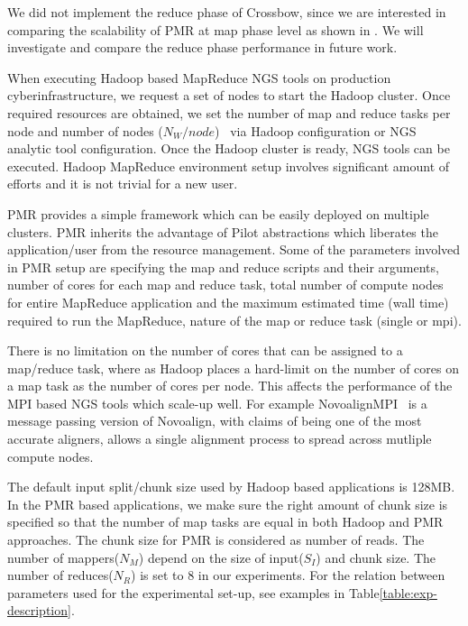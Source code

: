 \documentclass{acm_proc_article-sp}
\begin{document}
We did not implement the reduce phase of Crossbow, since we are
interested in comparing the scalability of PMR at map phase level as
shown in . We will investigate and compare the
reduce phase performance in future work.

When executing Hadoop based MapReduce NGS tools on production
cyberinfrastructure, we request a set of nodes to start the Hadoop
cluster. Once required resources are obtained, we set the number of
map and reduce tasks per node and number of nodes
($N_{W}/node$)~ via Hadoop
configuration or NGS analytic tool configuration.  Once the Hadoop
cluster is ready, NGS tools can be executed. Hadoop MapReduce
environment setup involves significant amount of efforts and it is not
trivial for a new user.

PMR provides a simple framework which can be easily deployed on
multiple clusters. PMR inherits the advantage of Pilot abstractions
which liberates the application/user from the resource
management. Some of the parameters involved in PMR setup are
specifying the map and reduce scripts and their arguments, number of
cores for each map and reduce task, total number of compute nodes for
entire MapReduce application and the maximum estimated time (wall
time) required to run the MapReduce, nature of the map or reduce task
(single or mpi).

There is no limitation on the number of cores that can be assigned to
a map/reduce task, where as Hadoop places a hard-limit on the number
of cores on a map task as the number of cores per node. This affects
the performance of the MPI based NGS tools which scale-up well. For
example NovoalignMPI~\cite{novo-align} is a message passing version of
Novoalign, with claims of being one of the most accurate aligners,
allows a single alignment process to spread across mutliple compute
nodes.

The default input split/chunk size used by Hadoop based applications
is 128MB. In the PMR based applications, we make sure the right amount
of chunk size is specified so that the number of map tasks are equal
in both Hadoop and PMR approaches. The chunk size for PMR is
considered as number of reads. The number of mappers($N_M$) depend on
the size of input($S_I$) and chunk size. The number of reduces($N_R$)
is set to 8 in our experiments. For the relation between parameters
used for the experimental set-up, see examples in
Table\ref{table:exp-description}.
\end{document}

